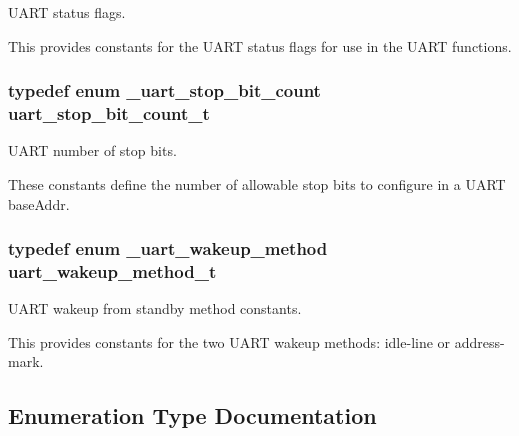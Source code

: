 U\+A\+RT status flags. 

This provides constants for the U\+A\+RT status flags for use in the U\+A\+RT functions. 
\subsubsection[{\texorpdfstring{uart\+\_\+stop\+\_\+bit\+\_\+count\+\_\+t}{uart_stop_bit_count_t}}]{\setlength{\rightskip}{0pt plus 5cm}typedef enum {\bf \+\_\+uart\+\_\+stop\+\_\+bit\+\_\+count}  {\bf uart\+\_\+stop\+\_\+bit\+\_\+count\+\_\+t}}\hypertarget{group__uart__hal_ga1df1fcb3fcd2d2db0b7ea0189fd94554}{}\label{group__uart__hal_ga1df1fcb3fcd2d2db0b7ea0189fd94554}


U\+A\+RT number of stop bits. 

These constants define the number of allowable stop bits to configure in a U\+A\+RT base\+Addr. 
\subsubsection[{\texorpdfstring{uart\+\_\+wakeup\+\_\+method\+\_\+t}{uart_wakeup_method_t}}]{\setlength{\rightskip}{0pt plus 5cm}typedef enum {\bf \+\_\+uart\+\_\+wakeup\+\_\+method}  {\bf uart\+\_\+wakeup\+\_\+method\+\_\+t}}\hypertarget{group__uart__hal_ga6aa156a75707a0cd36921c54080e2726}{}\label{group__uart__hal_ga6aa156a75707a0cd36921c54080e2726}


U\+A\+RT wakeup from standby method constants. 

This provides constants for the two U\+A\+RT wakeup methods\+: idle-\/line or address-\/mark. 

\subsection{Enumeration Type Documentation}
